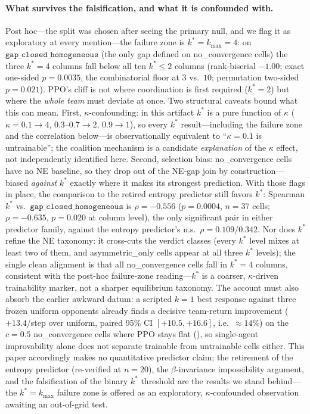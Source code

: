 \documentclass{anvil-paper}
\begin{document}
\paragraph{What survives the falsification, and what it is confounded
with.}
Post hoc---the split was chosen after seeing the primary null, and we
flag it as exploratory at every mention---the failure zone is
$k^{*}{=}k_{\max}{=}4$: on $\texttt{gap\_closed\_homogeneous}$ (the
only gap defined on \textsf{no\_convergence} cells) the three
$k^{*}{=}4$ columns fall below all ten $k^{*}{\leq}2$ columns
(rank-biserial $-1.00$; exact one-sided $p{=}0.0035$, the
combinatorial floor at $3$ vs.\ $10$; permutation two-sided
$p{=}0.021$). PPO's cliff is not where coordination is first required
($k^{*}{=}2$) but where the \emph{whole team} must deviate at once.
Two structural caveats bound what this can mean. First,
$\kappa$-confounding: in this artifact $k^{*}$ is a pure function of
$\kappa$ ($\kappa{=}0.1{\to}4$, $0.3$--$0.7{\to}2$, $0.9{\to}1$), so
every $k^{*}$ result---including the failure zone and the correlation
below---is observationally equivalent to ``$\kappa{=}0.1$ is
untrainable''; the coalition mechanism is a candidate
\emph{explanation} of the $\kappa$ effect, not independently
identified here. Second, selection bias: \textsf{no\_convergence}
cells have no NE baseline, so they drop out of the NE-gap join by
construction---biased \emph{against} $k^{*}$ exactly where it makes
its strongest prediction. With those flags in place, the comparison to
the retired entropy predictor still favors $k^{*}$: Spearman $k^{*}$
vs.\ $\texttt{gap\_closed\_homogeneous}$ is $\rho{=}-0.556$
($p{=}0.0004$, $n{=}37$ cells; $\rho{=}-0.635$, $p{=}0.020$ at column
level), the only significant pair in either predictor family, against
the entropy predictor's n.s.\ $\rho{=}0.109$/$0.342$. Nor does
$k^{*}$ refine the NE taxonomy: it cross-cuts the verdict classes
(every $k^{*}$ level mixes at least two of them, and
\textsf{asymmetric\_only} cells appear at all three $k^{*}$ levels);
the single clean alignment is that all \textsf{no\_convergence} cells
fall in $k^{*}{=}4$ columns, consistent with the post-hoc failure-zone
reading---$k^{*}$ is a coarser, $\kappa$-driven trainability marker,
not a sharper equilibrium taxonomy. The account must also absorb the earlier awkward datum: a
scripted $k{=}1$ best response against three frozen uniform opponents
already finds a decisive team-return improvement ($+13.4$/step over
uniform, paired 95\% CI $[+10.5, +16.6]$, i.e.\ ${\approx}14\%$) on the
$c{=}0.5$
\textsf{no\_convergence} cells where PPO stays flat
(), so
single-agent improvability alone does not separate trainable from
untrainable cells either. This paper accordingly makes no quantitative
predictor claim; the retirement of the entropy predictor (re-verified
at $n{=}20$), the $\beta$-invariance impossibility argument, and the
falsification of the binary $k^{*}$ threshold are the results we stand
behind---the $k^{*}{=}k_{\max}$ failure zone is offered as an
exploratory, $\kappa$-confounded observation awaiting an out-of-grid
test.
\end{document}
